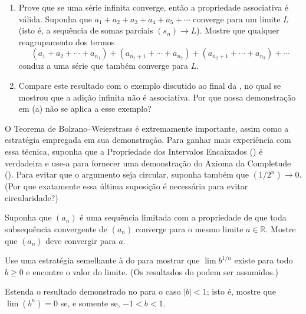 \begin{exercise}\label{ex:2-5-3}
\begin{enumerate}[label=(\alph*)]
\item Prove que se uma série infinita converge, então a propriedade associativa é válida. Suponha que $a_1 + a_2 + a_3 + a_4 + a_5 + \cdots$ converge para um limite $L$ (isto é, a sequência de somas parciais $(s_n) \to L$). Mostre que qualquer reagrupamento dos termos
\[
(a_1 + a_2 + \cdots + a_{n_1}) + (a_{n_1+1} + \cdots + a_{n_2}) + (a_{n_2+1} + \cdots + a_{n_3}) + \cdots
\]
conduz a uma série que também converge para $L$.
\item Compare este resultado com o exemplo discutido ao final da , no qual se mostrou que a adição infinita não é associativa. Por que nossa demonstração em (a) não se aplica a esse exemplo?
\end{enumerate}
\end{exercise}

\begin{exercise}\label{ex:2-5-4}
O Teorema de Bolzano--Weierstrass é extremamente importante, assim como a estratégia empregada em sua demonstração. Para ganhar mais experiência com essa técnica, suponha que a Propriedade dos Intervalos Encaixados () é verdadeira e use-a para fornecer uma demonstração do Axioma da Completude (). Para evitar que o argumento seja circular, suponha também que $(1/2^n) \to 0$. (Por que exatamente essa última suposição é necessária para evitar circularidade?)
\end{exercise}

\begin{exercise}\label{ex:2-5-5}
Suponha que $(a_n)$ é uma sequência limitada com a propriedade de que toda subsequência convergente de $(a_n)$ converge para o mesmo limite $a \in \mathbb{R}$. Mostre que $(a_n)$ deve convergir para $a$.
\end{exercise}

\begin{exercise}\label{ex:2-5-6}
Use uma estratégia semelhante à do  para mostrar que $\lim b^{1/n}$ existe para todo $b \geq 0$ e encontre o valor do limite. (Os resultados do  podem ser assumidos.)
\end{exercise}

\begin{exercise}\label{ex:2-5-7}
Estenda o resultado demonstrado no  para o caso $|b| < 1$; isto é, mostre que $\lim(b^n) = 0$ se, e somente se, $-1 < b < 1$.
\end{exercise}

